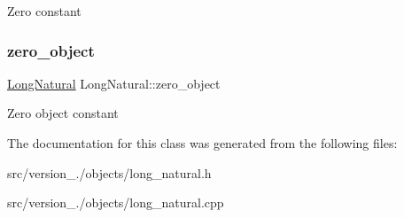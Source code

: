Zero constant \mbox{\label{classez_1_1objects_1_1LongNatural_aac7c3b61859bd9a941b1d408f3e2e67d}} 
\subsubsection{\texorpdfstring{zero\+\_\+object}{zero\_object}}
{\footnotesize\ttfamily \hyperlink{classez_1_1objects_1_1LongNatural}{Long\+Natural} Long\+Natural\+::zero\+\_\+object\hspace{0.3cm}{\ttfamily [static]}}

Zero object constant 

The documentation for this class was generated from the following files\+:\begin{DoxyCompactItemize}
\item 
src/version\+\_./objects/long\+\_\+natural.\+h\item 
src/version\+\_./objects/long\+\_\+natural.\+cpp\end{DoxyCompactItemize}
